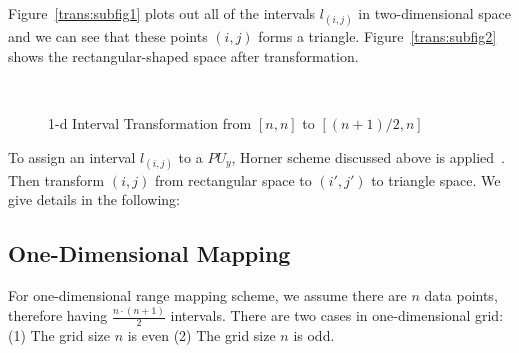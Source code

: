 \documentclass[AMA,LATO1COL]{WileyNJD-v2}
\begin{document}
Figure~\ref{trans:subfig1} plots out all of the intervals $l_{(i,j)}$ in two-dimensional space and we can see that these points $(i,j)$ forms a triangle. Figure~\ref{trans:subfig2} shows the rectangular-shaped space after transformation.

\begin{figure}[h]
\centering
{}
~~
\caption{1-d Interval Transformation from $[n,n]$ to $[(n+1)/2,n]$}\label{modelBF}
\end{figure}

To assign an interval $l_(i,j)$ to a $PU_y$, Horner scheme discussed above is applied~\cite{horner}. Then transform $(i,j)$ from rectangular space to $(i',j')$  to triangle space. We give details in the following:

\subsection{One-Dimensional Mapping}
For one-dimensional range mapping scheme, we assume there are $n$ data points, therefore having ${\frac{n \cdot (n+1)}{2}}$ intervals. There are two cases in one-dimensional grid: (1) The grid size $n$ is even (2) The grid size $n$ is odd. \\
\end{document}
